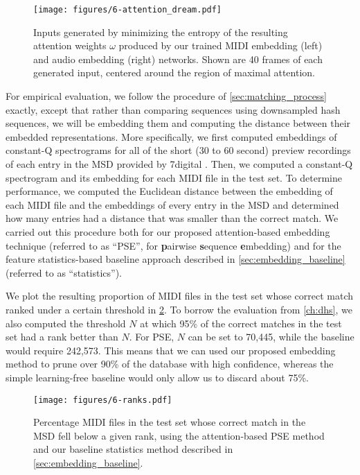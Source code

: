 \begin{figure}
  \texttt{[image: figures/6-attention\_dream.pdf]}
  \caption[Generated maximal attention inputs]{Inputs generated by minimizing the entropy of the resulting attention weights $\omega$ produced by our trained MIDI embedding (left) and audio embedding (right) networks.
Shown are 40 frames of each generated input, centered around the region of maximal attention.}
  \label{fig:attention_dream}
\end{figure}

For empirical evaluation, we follow the procedure of \cref{sec:matching_process} exactly, except that rather than comparing sequences using downsampled hash sequences, we will be embedding them and computing the distance between their embedded representations.
More specifically, we first computed embeddings of constant-Q spectrograms for all of the short (30 to 60 second) preview recordings of each entry in the MSD provided by 7digital \cite{schindler2012facilitating}.
Then, we computed a constant-Q spectrogram and its embedding for each MIDI file in the test set.
To determine performance, we computed the Euclidean distance between the embedding of each MIDI file and the embeddings of every entry in the MSD and determined how many entries had a distance that was smaller than the correct match.
We carried out this procedure both for our proposed attention-based embedding technique (referred to as ``PSE'', for \textbf{p}airwise \textbf{s}equence \textbf{e}mbedding) and for the feature statistics-based baseline approach described in \cref{sec:embedding_baseline} (referred to as ``statistics'').

We plot the resulting proportion of MIDI files in the test set whose correct match ranked under a certain threshold in \cref{fig:embedding_ranks}.
To borrow the evaluation from \cref{ch:dhs}, we also computed the threshold $N$ at which 95\% of the correct matches in the test set had a rank better than $N$.
For PSE, $N$ can be set to 70,445, while the baseline would require 242,573.
This means that we can used our proposed embedding method to prune over 90\% of the database with high confidence, whereas the simple learning-free baseline would only allow us to discard about 75\%.

\begin{figure}
  \texttt{[image: figures/6-ranks.pdf]}
  \caption[Percentage of the test set below a given rank]{Percentage MIDI files in the test set whose correct match in the MSD fell below a given rank, using the attention-based PSE method and our baseline statistics method described in \cref{sec:embedding_baseline}.}
  \label{fig:embedding_ranks}
\end{figure}

